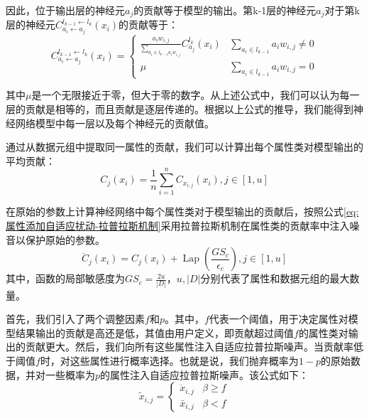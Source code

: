 因此，位于输出层的神经元$a_{j}$的贡献等于模型的输出。第k-1层的神经元$a_{j}$对于第k层的神经元$C_{a_{i} \leftarrow a_{j}}^{l_{k-1} \leftarrow l_{k}}\left(x_{i}\right)$的贡献等于：
\begin{equation}
C_{a_{i} \leftarrow a_{j}}^{l_{k-1} \leftarrow l_{k}}\left(x_{i}\right)=\left\{\begin{array}{cc}\frac{a_{i} w_{i, j}}{\sum_{a_{i} \in l_{k-1} a_{i} w_{i, j}}} C_{a_{j}}^{l_{k}}\left(x_{i}\right) & \sum_{a_{i} \in l_{k-1}} a_{i} w_{i, j} \neq 0 \\ \mu & \sum_{a_{i} \in l_{k-1}} a_{i} w_{i, j}=0\end{array}\right.
\end{equation}

其中$\mu$是一个无限接近于零，但大于零的数字。从上述公式中，我们可以认为每一层的贡献是相等的，而且贡献是逐层传递的。根据以上公式的推导，我们能得到神经网络模型中每一层以及每个神经元的贡献值。

通过从数据元组中提取同一属性的贡献，我们可以计算出每个属性类对模型输出的平均贡献：
\begin{equation}\label{eq:属性添加自适应扰动}
C_{j}\left(x_{i}\right)=\frac{1}{n} \sum_{i=1}^{n} C_{x_{i, j}}\left(x_{i}\right), j \in[1, u]
\end{equation}

在原始的参数上计算神经网络中每个属性类对于模型输出的贡献后，按照公式\ref{eq:属性添加自适应扰动-拉普拉斯机制}采用拉普拉斯机制在属性类的贡献率中注入噪音以保护原始的参数。
\begin{equation}\label{eq:属性添加自适应扰动-拉普拉斯机制}
\ddot{C}_{j}\left(x_{i}\right)=C_{j}\left(x_{i}\right)+\operatorname{Lap}\left(\frac{G S_{c}}{\epsilon_{c}}\right), j \in[1, u]
\end{equation}
其中，函数的局部敏感度为$G S_{c}=\frac{2 u}{|D|}$，$u,|D|$分别代表了属性和数据元组的最大数量。

首先，我们引入了两个调整因素$f$和$p$。其中，$f$代表一个阈值，用于决定属性对模型结果输出的贡献是高还是低，其值由用户定义，即贡献超过阈值$f$的属性类对输出的贡献更大。然后，我们向所有这些属性注入自适应拉普拉斯噪声。当贡献率低于阈值$f$时，对这些属性进行概率选择。也就是说，我们抛弃概率为$1-p$的原始数据，并对一些概率为$p$的属性注入自适应拉普拉斯噪声。该公式如下：
\begin{equation}\label{eq:神经网络加噪}
\tilde{x}_{i, j}=\left\{\begin{array}{ll}
\ddot{x}_{i, j} & \beta \geq f \\
\bar{x}_{i, j} & \beta<f
\end{array}\right.
\end{equation}

